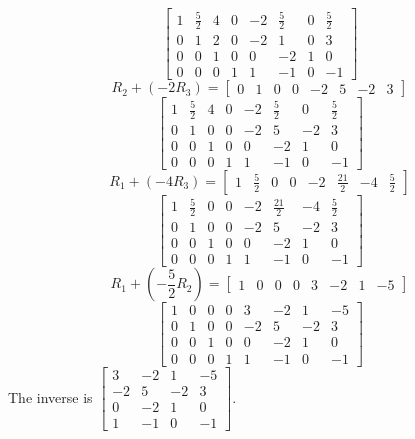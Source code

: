 \documentclass[11pt]{article}
\begin{document}
\[
    \left[
    \begin{array}{cccc|cccc}
        1 & \frac{5}{2} & 4 & 0 & -2 & \frac{5}{2} & 0 & \frac{5}{2} \\
        0 & 1 & 2 & 0 & -2 & 1 & 0 & 3 \\
        0 & 0 & 1 & 0 & 0 & -2 & 1 & 0 \\
        0 & 0 & 0 & 1 & 1 & -1 & 0 & -1
    \end{array}
    \right]
\]
\[
    R_2 + (-2R_3) = 
    \left[
    \begin{array}{cccc|cccc}
        0 & 1 & 0 & 0 & -2 & 5 & -2 & 3
    \end{array}
    \right]
\]
\[
    \left[
    \begin{array}{cccc|cccc}
        1 & \frac{5}{2} & 4 & 0 & -2 & \frac{5}{2} & 0 & \frac{5}{2} \\
        0 & 1 & 0 & 0 & -2 & 5 & -2 & 3 \\
        0 & 0 & 1 & 0 & 0 & -2 & 1 & 0 \\
        0 & 0 & 0 & 1 & 1 & -1 & 0 & -1
    \end{array}
    \right]
\]
\[
    R_1 + (-4R_3) =
    \left[
    \begin{array}{cccc|cccc}
        1 & \frac{5}{2} & 0 & 0 & -2 & \frac{21}{2} & -4 & \frac{5}{2}
    \end{array}
    \right]
\]
\[
    \left[
    \begin{array}{cccc|cccc}
        1 & \frac{5}{2} & 0 & 0 & -2 & \frac{21}{2} & -4 & \frac{5}{2} \\
        0 & 1 & 0 & 0 & -2 & 5 & -2 & 3 \\
        0 & 0 & 1 & 0 & 0 & -2 & 1 & 0 \\
        0 & 0 & 0 & 1 & 1 & -1 & 0 & -1
    \end{array}
    \right]
\]
\[
    R_1 + (-\frac{5}{2}R_2) =
    \left[
    \begin{array}{cccc|cccc}
        1 & 0 & 0 & 0 & 3 & -2 & 1 & -5
    \end{array}
    \right]
\]
\[
    \left[
    \begin{array}{cccc|cccc}
        1 & 0 & 0 & 0 & 3 & -2 & 1 & -5 \\
        0 & 1 & 0 & 0 & -2 & 5 & -2 & 3 \\
        0 & 0 & 1 & 0 & 0 & -2 & 1 & 0 \\
        0 & 0 & 0 & 1 & 1 & -1 & 0 & -1
    \end{array}
    \right]
\]
The inverse is \(
    \begin{bmatrix}
        3 & -2 & 1 & -5 \\
        -2 & 5 & -2 & 3 \\
        0 & -2 & 1 & 0 \\
        1 & -1 & 0 & -1
    \end{bmatrix}\).
\end{document}
